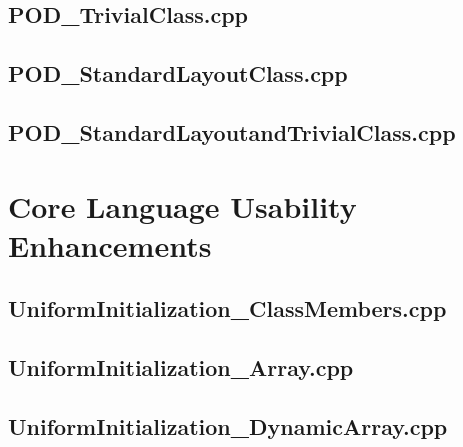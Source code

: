 \documentclass[11pt]{report}
\newcommand{\Cpp}{\lstset{language=C++,keywordstyle=\bfseries,breaklines,breakindent=30pt}}
\begin{document}
\begin{appendix}
\subsection{POD\_TrivialClass.cpp}
\label{POD_TrivialClass}


\subsection{POD\_StandardLayoutClass.cpp}
\label{POD_StandardLayoutClass}


\subsection{POD\_StandardLayoutandTrivialClass.cpp}
\label{POD_StandardLayoutandTrivialClass}


\section{Core Language Usability Enhancements}
\label{Appendix: corelanguage usabiliy enhancements}

\Cpp

\subsection{UniformInitialization\_ClassMembers.cpp}
\label{UniformInitialization_ClassMembers}


\subsection{UniformInitialization\_Array.cpp}
\label{UniformInitialization_Array}


\subsection{UniformInitialization\_DynamicArray.cpp}
\label{UniformInitialization_DynamicArray}



\end{appendix}
\end{document}
